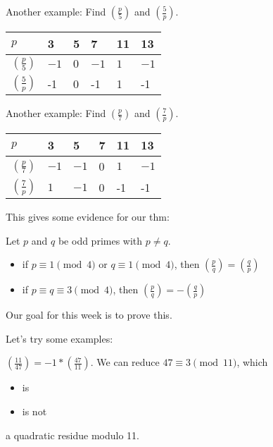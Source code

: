 \documentclass[letterpaper, 11 pt]{article}
\begin{document}
   
\begin{br}[5 minutes]
 
   Another example: Find $\left(\frac{p}{5}\right)$ and $\left(\frac{5}{p}\right)$.
 
\begin{tabular}{|l||l|l|l|l|l|}\hline
$p$&3&5&7&11&13\\\hline\hline
$\left(\frac{p}{5}\right)$&$  {-1}$&$  {0}$&$  {-1}$&$  {1}$&$  {-1}$
\\\hline
$\left(\frac{5}{p}\right)$&-1&0&-1&1&-1\\\hline
\end{tabular}
  
   Another example: Find $\left(\frac{p}{7}\right)$ and $\left(\frac{7}{p}\right)$.

\begin{tabular}{|l||l|l|l|l|l|}\hline
$p$&3&5&7&11&13\\\hline\hline
$\left(\frac{p}{7}\right)$&$  {-1}$&$  {-1}$&0&$  {1}$&$  {-1}$
\\\hline
$\left(\frac{7}{p}\right)$&$  {1}$&$  {-1}$&0&-1&-1\\\hline
\end{tabular}

  \end{br}
This gives some evidence for our thm:
\begin{thm}
 Let $p$ and $q$ be odd primes with $p\neq q$. 
\begin{itemize}
 \item if $p\equiv 1 \pmod 4$ or $q\equiv 1 \pmod 4$, then $\left(\frac{p}{q}\right)=\left(\frac{q}{p}\right)$
 \item if $p\equiv q\equiv 3 \pmod 4$, then $\left(\frac{p}{q}\right)=-\left(\frac{q}{p}\right)$
\end{itemize}
\end{thm}

Our goal for this week is to prove this.

Let's try some examples: 
\begin{poll}
 $\left(\frac{11}{47}\right)= {-1}
* \left(\frac{47}{11}\right)$. We can reduce $47\equiv {3}
 \pmod{11}$, which 
\begin{itemize}
 \item  {is}
 \item {is not}
\end{itemize}
a quadratic residue modulo 11. %
\end{poll}
\end{document}
